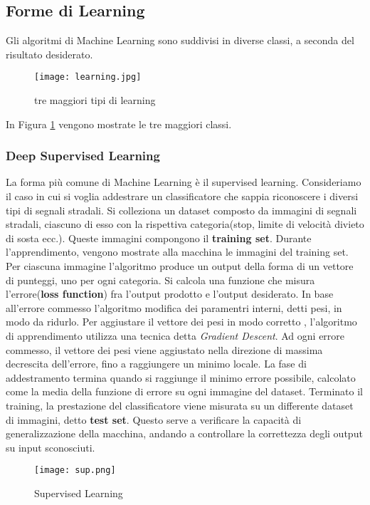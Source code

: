 \subsection{Forme di Learning}
Gli algoritmi di Machine Learning sono suddivisi in diverse classi, a seconda del risultato desiderato.
\begin{figure}
  \texttt{[image: learning.jpg]}
  \caption{tre maggiori tipi di learning\cite{learn}}
  \label{fig:ml}
\end{figure}
In Figura \ref{fig:ml} vengono mostrate le tre maggiori classi.
\subsubsection{Deep Supervised Learning}
La forma più comune di Machine Learning è il supervised learning. Consideriamo il caso in cui si voglia addestrare un classificatore
che sappia riconoscere i diversi tipi di segnali stradali. Si colleziona un dataset composto da immagini di segnali stradali, ciascuno di esso con la rispettiva categoria(stop, limite di velocità
divieto di sosta ecc.). Queste immagini compongono il \textbf{training set}. Durante l'apprendimento, vengono mostrate alla macchina  le immagini del training set. Per ciascuna immagine l'algoritmo produce un output della forma di un vettore di punteggi, uno per ogni categoria.
Si calcola una funzione che misura l'errore(\textbf{loss function}) fra l'output prodotto e l'output desiderato. In base all'errore commesso l'algoritmo modifica dei paramentri interni, detti pesi, 
in modo da ridurlo. Per aggiustare il vettore dei pesi in modo corretto , l'algoritmo di apprendimento utilizza una tecnica detta \emph{Gradient Descent}. Ad ogni errore commesso, il vettore dei pesi viene aggiustato nella direzione di massima decrescita dell'errore, fino a raggiungere un minimo locale. La fase di addestramento termina quando si raggiunge il minimo errore possibile, calcolato come la media della funzione di errore su ogni immagine del dataset.
Terminato il training, la prestazione del classificatore viene misurata su un differente dataset di immagini, detto \textbf{test set}. Questo serve a verificare
la capacità di generalizzazione della macchina, andando a controllare la correttezza degli output su input sconosciuti.

\begin{figure}
  \texttt{[image: sup.png]}
  \caption{Supervised Learning\cite{sup}}
  \label{fig:sup}
\end{figure}


